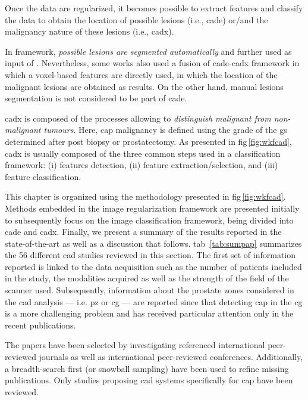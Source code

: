 Once the data are regularized, it becomes possible to extract features and
classify the data to obtain the location of possible lesions (i.e.,
\ac{cade}) or/and the malignancy nature of these lesions (i.e., \ac{cadx}).

In  framework, \textit{possible lesions are segmented automatically}
and further used as input of .
Nevertheless, some works also used a fusion of \ac{cade}-\ac{cadx} framework in
which a voxel-based features are directly used, in which the location of the
malignant lesions are obtained as results.
On the other hand, manual lesions segmentation is not considered to be part of
\ac{cade}.

\Ac{cadx} is composed of the processes allowing to \textit{distinguish
  malignant from non-malignant tumours}.
Here, \ac{cap} malignancy is defined using the grade of the \ac{gs} determined
after post biopsy or prostatectomy.
As presented in \ac{fig}\,\ref{fig:wkfcad}, \ac{cadx} is usually composed of
the three common steps used in a classification framework: (i) features
detection, (ii) feature extraction/selection, and (iii) feature
classification.

This chapter is organized using the methodology presented in
\acs{fig}\,\ref{fig:wkfcad}.
Methods embedded in the image regularization framework are presented initially
to subsequently focus on the image classification framework, being divided into
\ac{cade} and \ac{cadx}.
Finally, we present a summary of the results reported in the state-of-the-art
as well as a discussion that follows.
\Acl{tab}~\ref{tab:sumpap} summarizes the 56 different \ac{cad} studies
reviewed in this section.
The first set of information reported is linked to the data acquisition such as
the number of patients included in the study, the modalities acquired as well
as the strength of the field of the scanner used.
Subsequently, information about the prostate zones considered in the \ac{cad}
analysis --- i.e. \ac{pz} or \ac{cg} --- are reported since that detecting
\ac{cap} in the \ac{cg} is a more challenging problem and has received
particular attention only in the recent publications.

The papers have been selected by investigating referenced international
peer-reviewed journals as well as international peer-reviewed conferences.
Additionally, a breadth-search first (or snowball sampling) have been used to
refine missing publications.
Only studies proposing \ac{cad} systems specifically for \ac{cap} have been
reviewed.





